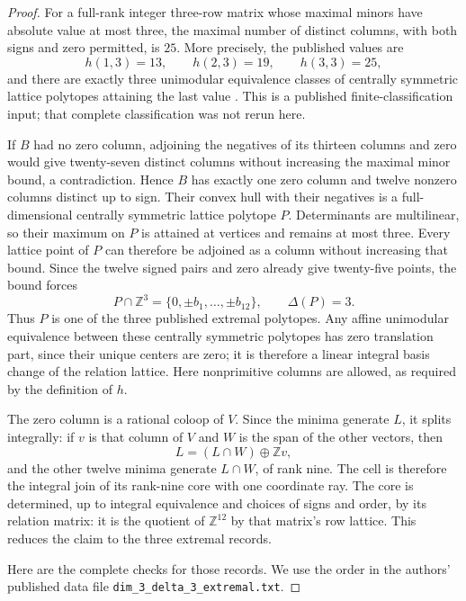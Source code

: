 \begin{proof}
For a full-rank integer three-row matrix whose maximal minors
have absolute value at most three, the maximal number of
distinct columns, with both signs and zero permitted, is
$25$. More precisely, the published values are
\[
 h(1,3)=13,\qquad h(2,3)=19,\qquad h(3,3)=25,
\]
and there are exactly three unimodular equivalence classes of
centrally symmetric lattice polytopes attaining the last value
\cite[\S\S5.1--5.2, Tables~1 and~3, p.~85]{AverkovSchymura2024}.
This is a published finite-classification input; that complete
classification was not rerun here.

If $B$ had no zero column, adjoining the negatives of its
thirteen columns and zero would give twenty-seven distinct
columns without increasing the maximal minor bound, a
contradiction. Hence $B$ has exactly one zero column and twelve
nonzero columns distinct up to sign. Their convex hull with
their negatives is a full-dimensional centrally symmetric
lattice polytope $P$. Determinants are multilinear, so their
maximum on $P$ is attained at vertices and remains at most
three. Every lattice point of $P$ can therefore be adjoined as
a column without increasing that bound. Since the twelve
signed pairs and zero already give twenty-five points, the
bound forces
\[
       P\cap\mathbb Z^3=\{0,\pm b_1,\ldots,\pm b_{12}\},
       \qquad \Delta(P)=3.                              \tag{TG.2}
\]
Thus $P$ is one of the three published extremal polytopes.
Any affine unimodular equivalence between these centrally
symmetric polytopes has zero translation part, since their
unique centers are zero; it is therefore a linear integral
basis change of the relation lattice.
Here nonprimitive columns are allowed, as required by the
definition of $h$.

The zero column is a rational coloop of $V$. Since the minima
generate $L$, it splits integrally: if $v$ is that column of
$V$ and $W$ is the span of the other vectors, then
\[
 L=(L\cap W)\oplus\mathbb Zv ,
\]
and the other twelve minima generate $L\cap W$, of rank nine.
The cell is therefore the integral join of its rank-nine core
with one coordinate ray. The core is determined, up to integral
equivalence and choices of signs and order, by its relation
matrix: it is the quotient of $\mathbb Z^{12}$ by that
matrix's row lattice. This reduces the claim to the three
extremal records.

Here are the complete checks for those records. We use the
order in the authors' published data file
\texttt{dim\_3\_delta\_3\_extremal.txt}.


\end{proof}
